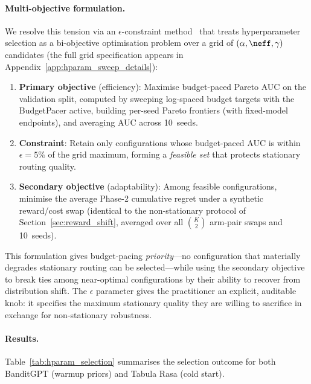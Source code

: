 \paragraph{Multi-objective formulation.}
We resolve this tension via an
$\epsilon$-constraint method~\cite{haimes1971bicriterion} that
treats hyperparameter selection as a bi-objective optimisation
problem over a grid of $(\alpha, \neff, \gamma)$ candidates
(the full grid specification appears in
Appendix~\ref{app:hparam_sweep_details}):
%
\begin{enumerate}[nosep,leftmargin=*]
  \item \textbf{Primary objective} (efficiency):
    Maximise budget-paced Pareto AUC on the validation split, computed
    by sweeping log-spaced budget targets with the BudgetPacer
    active, building per-seed Pareto frontiers (with fixed-model
    endpoints), and averaging AUC across 10~seeds.

  \item \textbf{Constraint}:
    Retain only configurations whose budget-paced AUC is within
    $\epsilon{=}5\%$ of the grid maximum, forming a \emph{feasible set}
    that protects stationary routing quality.

  \item \textbf{Secondary objective} (adaptability):
    Among feasible configurations, minimise the average Phase-2
    cumulative regret under a synthetic reward/cost swap
    (identical to the non-stationary protocol of
    Section~\ref{sec:reward_shift}, averaged over all
    $\binom{K}{2}$ arm-pair swaps and 10~seeds).
\end{enumerate}
%
This formulation gives budget-pacing \emph{priority}---no
configuration that materially degrades stationary routing can be
selected---while using the secondary objective to break ties among
near-optimal configurations by their ability to recover from
distribution shift.
The $\epsilon$ parameter gives the practitioner an explicit,
auditable knob: it specifies the maximum stationary quality they are
willing to sacrifice in exchange for non-stationary robustness.

\paragraph{Results.}
Table~\ref{tab:hparam_selection} summarises the selection outcome
for both BanditGPT (warmup priors) and Tabula Rasa (cold start).

